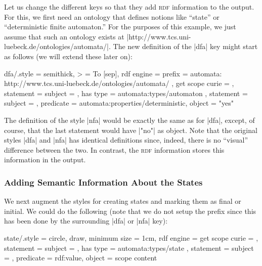 Let us change the different keys so that they add \textsc{rdf}
information to the output. For this, we first need an ontology that
defines notions like ``state'' or ``deterministic finite automaton.''
For the purposes of this example, we just assume that such an ontology
exists at |http://www.tcs.uni-luebeck.de/ontologies/automata/|. The new
definition of the |dfa| key might start as follows (we will extend
these later on):

\begin{codeexample}
dfa/.style = {
  semithick, > = To [sep], %
  rdf engine = {
    prefix = { automata: http://www.tcs.uni-luebeck.de/ontologies/automata/ },
    get scope curie = \mylibAutomatonCurie,
    statement = {
      subject     = \mylibAutomatonCurie,
      has type    = automata:types/automaton },
    statement = {
      subject     = \mylibAutomatonCurie,
      predicate   = automata:properties/deterministic,
      object      = "yes" } } }
\end{codeexample}

The definition of the style |nfa| would be exactly the same as for
|dfa|, except, of course, that the last statement would have |"no"| as
object. Note that the original styles |dfa| and |nfa| has identical
definitions since, indeed, there is no ``visual'' difference between
the two. In contrast, the \textsc{rdf} information stores this
information in the output.


\subsubsection{Adding Semantic Information About the States}

We next augment the styles for creating states and marking them as
final or initial. We could do the following (note that we do not setup
the prefix since this has been done by the surrounding |dfa| or |nfa|
key): 

\begin{codeexample}
state/.style = {
  circle, draw, minimum size = 1cm, %
  rdf engine = {
    get scope curie = \mylibStateCurie,
    statement = {
      subject     = \mylibStateCurie,
      has type    = automata:types/state },
    statement = {
      subject     = \mylibStateCurie,
      predicate   = rdf:value,
      object      = scope content } } } 
\end{codeexample}

